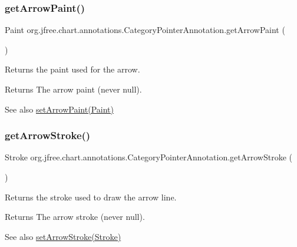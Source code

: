 \subsubsection{\texorpdfstring{get\+Arrow\+Paint()}{getArrowPaint()}}
{\footnotesize\ttfamily Paint org.\+jfree.\+chart.\+annotations.\+Category\+Pointer\+Annotation.\+get\+Arrow\+Paint (\begin{DoxyParamCaption}{ }\end{DoxyParamCaption})}

Returns the paint used for the arrow.

\begin{DoxyReturn}{Returns}
The arrow paint (never {\ttfamily null}).
\end{DoxyReturn}
\begin{DoxySeeAlso}{See also}
\mbox{\hyperlink{classorg_1_1jfree_1_1chart_1_1annotations_1_1_category_pointer_annotation_ab9c3c0cd2a1057181ae49aa8acb650ed}{set\+Arrow\+Paint(\+Paint)}} 
\end{DoxySeeAlso}
\mbox{\label{classorg_1_1jfree_1_1chart_1_1annotations_1_1_category_pointer_annotation_aee9f2db0519b9f8b02ec0d9c1f9abebf}} 
\subsubsection{\texorpdfstring{get\+Arrow\+Stroke()}{getArrowStroke()}}
{\footnotesize\ttfamily Stroke org.\+jfree.\+chart.\+annotations.\+Category\+Pointer\+Annotation.\+get\+Arrow\+Stroke (\begin{DoxyParamCaption}{ }\end{DoxyParamCaption})}

Returns the stroke used to draw the arrow line.

\begin{DoxyReturn}{Returns}
The arrow stroke (never {\ttfamily null}).
\end{DoxyReturn}
\begin{DoxySeeAlso}{See also}
\mbox{\hyperlink{classorg_1_1jfree_1_1chart_1_1annotations_1_1_category_pointer_annotation_a0cf30cc0bd8a1bc3cb086a1a03f4db70}{set\+Arrow\+Stroke(\+Stroke)}} 
\end{DoxySeeAlso}
\mbox{\label{classorg_1_1jfree_1_1chart_1_1annotations_1_1_category_pointer_annotation_a40de1109ca2d33db27e40be5a874f951}} 
